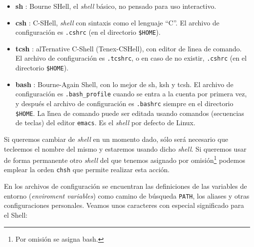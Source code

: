 \begin{itemize}
\item {\bf sh} : Bourne SHell, el {\it shell} b{\'a}sico, no pensado para uso
  interactivo. 

\item {\bf csh} : C-SHell,  {\it shell} con sintaxis como el lenguaje  ``C''.
El archivo de configuraci{\'o}n es \verb+.cshrc+ (en el directorio {\tt \$HOME}).

\item {\bf tcsh} : alTernative C-Shell (Tenex-CSHell), con editor de
  l{\'\i}nea de comando.  El archivo de configuraci{\'o}n es \verb+.tcshrc+, o
  en caso de no existir, \verb+.cshrc+ (en el directorio {\tt \$HOME}).
  
\item {\bf bash} : Bourne-Again Shell, con lo mejor de sh, ksh y tcsh.
  El archivo de configuraci{\'o}n es \verb+.bash_profile+ cuando se entra
  a la cuenta por primera vez, y despu{\'e}s el archivo de configuraci{\'o}n
  es \verb+.bashrc+ siempre en el directorio {\tt \$HOME}. La l{\'\i}nea de
  comando puede ser editada usando comandos (secuencias de teclas) del
  editor \verb+emacs+. Es el {\it shell} por defecto de Linux.
\end{itemize}

Si queremos cambiar de {\it shell} en un momento dado, s{\'o}lo ser{\'a}
necesario que tecleemos el nombre del mismo y estaremos usando dicho
{\it shell}. Si queremos usar de forma permanente otro {\it shell} del
que tenemos asignado por omisi{\'o}n\footnote{Por omisi{\'o}n se asigna bash.}
podemos emplear la orden \verb+chsh+ que permite realizar esta acci{\'o}n.

En los archivos de configuraci{\'o}n se encuentran las definiciones de las
variables de entorno ({\it enviroment variables}) como camino de b{\'u}squeda
\verb+PATH+, los aliases y otras configuraciones personales.  Veamos
unos caracteres con especial significado para el Shell:

